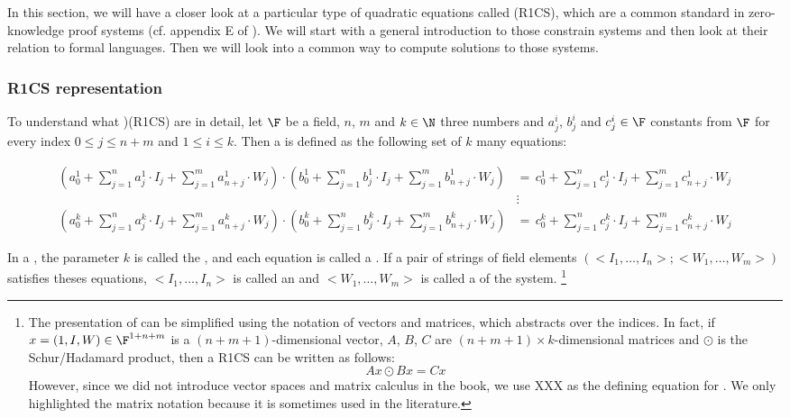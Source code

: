 In this section, we will have a closer look at a particular type of quadratic equations called  (R1CS), which are a common standard in zero-knowledge proof systems (cf. appendix E of \cite{sasson-2013}). We will start with a general introduction to those constrain systems and then look at their relation to formal languages. Then we will look into a common way to compute solutions to those systems. 

\subsubsection{R1CS representation} To understand what  )(R1CS) are in detail, let $\F$ be a field, $n$, $m$ and $k\in\N$ three numbers and $a_j^i$, $b_j^i$ and $c_j^i\in\F$ constants from $\F$ for every index $0\leq j \leq n+m$ and $1\leq i \leq k$. Then a  is defined as the following set of $k$ many equations: 

\begin{definition}\label{R1CS}
\begin{align*}
\scriptstyle\left(a^1_0 + \sum_{j=1}^n a^1_j \cdot I_j + \sum_{j=1}^m a^1_{n+j} \cdot W_j  \right) \cdot 
\left(b^1_0 + \sum_{j=1}^n b^1_j \cdot I_j + \sum_{j=1}^m b^1_{n+j} \cdot W_j  \right) &=\, 
\scriptstyle c^1_0 + \sum_{j=1}^n c^1_j \cdot I_j + \sum_{j=1}^m c^1_{n+j} \cdot W_j\\
       & \vdots\\
\scriptstyle\left(a^k_0 + \sum_{j=1}^n a^k_j \cdot I_j + \sum_{j=1}^m a^k_{n+j} \cdot W_j  \right) \cdot 
\left(b^k_0 + \sum_{j=1}^n b^k_j \cdot I_j + \sum_{j=1}^m b^k_{n+j} \cdot W_j  \right) &=\, 
\scriptstyle c^k_0 + \sum_{j=1}^n c^k_j \cdot I_j + \sum_{j=1}^m c^k_{n+j} \cdot W_j       
\end{align*}
\end{definition}

In a , the parameter $k$ is called the , and each equation is called a . If a pair of strings of field elements $(<I_1,\ldots, I_n>; <W_1,\ldots,W_m>)$  satisfies theses equations, $<I_1,\ldots, I_n>$ is called an  and $<W_1,\ldots,W_m>$ is called a  of the system.%
\footnote{The presentation of  can be simplified using the notation of vectors and matrices, which abstracts over the indices. In fact, if $x= (1,I,W)\in \F^{1+n+m}$ is a $(n+m+1)$-dimensional vector, $A$, $B$, $C$ are $(n+m+1)\times k$-dimensional matrices and $\odot$ is the Schur/Hadamard product, then a R1CS can be written as follows:
$$
Ax \odot Bx = Cx
$$
However,  since we did not introduce vector spaces and matrix calculus in the book, we use XXX as the defining equation for . We only highlighted the matrix notation because it is sometimes used in the literature.}

